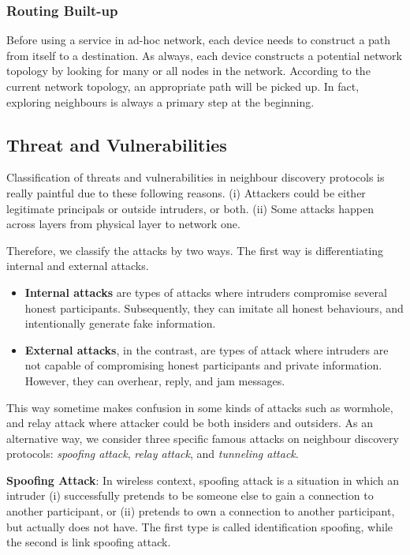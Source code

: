 \subsubsection*{Routing Built-up}

Before using a service in ad-hoc network, each device needs to construct a path from itself to a destination. As always, each device constructs a potential network topology by looking for many or all nodes in the network. According to the current network topology, an appropriate path will be picked up. In fact, exploring neighbours is always a primary step at the beginning. 

\subsection{Threat and Vulnerabilities}\label{threatndp}
Classification of threats and vulnerabilities in neighbour discovery protocols is really paintful due to these following reasons. (i) Attackers could be either legitimate principals or outside intruders, or both. (ii) Some attacks happen across layers from physical layer to network one. 

Therefore, we classify the attacks by two ways. The first way is differentiating internal and external attacks. 

\begin{itemize}
\item \textbf{Internal attacks} are types of attacks where intruders compromise several honest participants. Subsequently, they can imitate all honest behaviours, and intentionally generate fake information. 
\item \textbf{External attacks}, in the contrast, are types of attack where intruders are not capable of compromising honest participants and private information. However, they can overhear, reply, and jam messages. 
\end{itemize}

This way sometime makes confusion in some kinds of attacks such as wormhole, and relay attack where attacker could be both insiders and outsiders. As an alternative way, we consider three specific famous attacks on neighbour discovery protocols: \emph{spoofing attack}, \emph{relay attack}, and \emph{tunneling attack}.

\textbf{Spoofing Attack}: In wireless context, spoofing attack is a situation in which an intruder (i) successfully pretends to be someone else to gain a connection to another participant, or (ii) pretends to own a connection to another participant, but actually does not have. The first type is called identification spoofing, while the second is link spoofing attack. 

